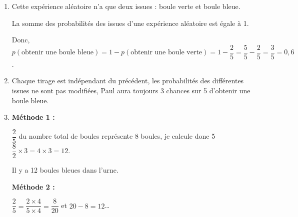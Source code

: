 
\medskip

\begin{enumerate}
\item Cette expérience aléatoire n'a que deux issues : boule verte et boule bleue.

La somme des probabilités des issues d'une expérience aléatoire est égale à 1.

Donc, $p(\text{obtenir une boule bleue}) = 1 - p(\text{obtenir une boule verte}) = 1 - \dfrac{2}{5} = \dfrac{5}{5} - \dfrac{2}{5}  =\dfrac{3}{5} = 0,6$.
\item Chaque tirage est indépendant du précédent, les probabilités des différentes
issues ne sont pas modifiées, Paul aura toujours 3 chances sur 5 d'obtenir une
boule bleue.
\item
 
\textbf{Méthode 1 :}
 
$\dfrac{2}{5}$ du nombre total de boules représente 8 boules, je calcule donc
5
$\dfrac{8}{2} \times  3 = 4 \times 3 = 12$.
 
Il y a 12 boules bleues dans l'urne.
 
\textbf{Méthode 2 :}
 
$\dfrac{2}{5} = \dfrac{2\times 4}{5\times 4} = \dfrac{8}{20}$ et $20 - 8 = 12$\ldots 
\end{enumerate}

\bigskip

